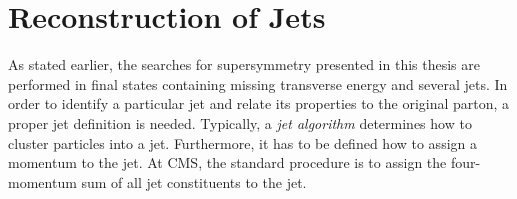 \section{Reconstruction of Jets}
\label{sec:jets_reco}
As stated earlier, the searches for supersymmetry presented in this thesis are performed in final states containing missing transverse energy and several jets. %
In order to identify a particular jet and relate its properties to the original parton, a proper jet definition is needed. Typically, a \textit{jet algorithm} determines how to cluster particles into a jet. Furthermore, it has to be defined how to assign a momentum to the jet. At CMS, the standard procedure is to assign the four-momentum sum of all jet constituents to the jet. \\
